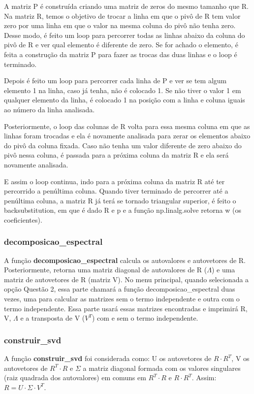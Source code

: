 \documentclass[a4paper,12pt,twoside]{article}
\begin{document}
A matriz P é construída criando uma matriz de zeros do mesmo tamanho que R. Na matriz R, temos o objetivo de trocar a linha em que o pivô de R tem valor zero por uma linha em que o valor na mesma coluna do pivô não tenha zero. Desse modo, é feito um loop para percorrer todas as linhas abaixo da coluna do pivô de R e ver qual elemento é diferente de zero. Se for achado o elemento, é feita a construção da matriz P para fazer as trocas das duas linhas e o loop é terminado. 

Depois é feito um loop para percorrer cada linha de P e ver se tem algum elemento 1 na linha, caso já tenha, não é colocado 1. Se não tiver o valor 1 em qualquer elemento da linha, é colocado 1 na posição com a linha e coluna iguais ao número da linha analisada. 

Posteriormente, o loop das colunas de R volta para essa mesma coluna em que as linhas foram trocadas e ela é novamente analisada para zerar os elementos abaixo do pivô da coluna fixada. Caso não tenha um valor diferente de zero abaixo do pivô nessa coluna, é passada para a próxima coluna da matriz R e ela será novamente analisada.

E assim o loop continua, indo para a próxima coluna da matriz R até ter percorrido a penúltima coluna. Quando tiver terminado de percorrer até a penúltima coluna, a matriz R já terá se tornado triangular superior, é feito o backsubstitution, em que é dado R e p e a função np.linalg.solve retorna w (os coeficientes). 

\subsubsection{decomposicao\_espectral}
   A função \textbf{decomposicao\_espectral} calcula os autovalores e autovetores de R. Posteriormente, retorna uma matriz diagonal de autovalores de R ($\Lambda$) e uma matriz de autovetores de R (matriz V). No menu principal, quando selecionada a opção Questão 2, essa parte chamará a função decomposicao\_espectral duas vezes, uma para calcular as matrizes sem o termo independente e outra com o termo independente. Essa parte usará essas matrizes encontradas e imprimirá R, V, $\Lambda$ e a transposta de V ($V^T$) com e sem o termo independente. 
\subsubsection{construir\_svd}
   A função \textbf{construir\_svd} foi considerada como: U os autovetores de $R\cdot R^{T}$, V os autovetores de $R^{T}\cdot
    R$ e $\Sigma$ a matriz diagonal formada com os valores singulares (raiz quadrada dos autovalores) em comuns em $R^{T}\cdot R$ e $R\cdot R^{T}$. Assim: $R = U\cdot \Sigma \cdot V^{T}$.
    
\end{document}
